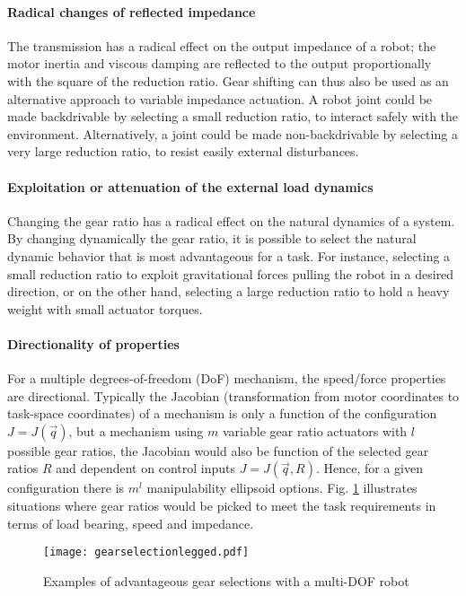 \paragraph{Radical changes of reflected impedance}
The transmission has a radical effect on the output impedance of a robot; the motor inertia and viscous damping are reflected to the output proportionally with the square of the reduction ratio. Gear shifting can thus also be used as an alternative approach to variable impedance actuation. A robot joint could be made backdrivable by selecting a small reduction ratio, to interact safely with the environment.  Alternatively, a joint could be made non-backdrivable by selecting a very large reduction ratio, to resist easily external disturbances.

\paragraph{Exploitation or attenuation of the external load dynamics}
Changing the gear ratio has a radical effect on the natural dynamics of a system. By changing dynamically the gear ratio, it is possible to select the natural dynamic behavior that is most advantageous for a task. For instance, selecting a small reduction ratio to exploit gravitational forces pulling the robot in a desired direction, or on the other hand, selecting a large reduction ratio to hold a heavy weight with small actuator torques.

\paragraph{Directionality of properties}
For a multiple degrees-of-freedom (DoF) mechanism, the speed/force properties are directional. Typically the Jacobian (transformation from motor coordinates to task-space coordinates) of a mechanism is only a function of the configuration $J=J(\vec{q})$, but a mechanism using $m$ variable gear ratio actuators with $l$ possible gear ratios, the Jacobian would also be function of the selected gear ratios $R$ and dependent on control inputs $J=J(\vec{q},R)$. Hence, for a given configuration there is $m^l$ manipulability ellipsoid options. Fig. \ref{fig:gearselectionlegged} illustrates situations where gear ratios would be picked to meet the task requirements in terms of load bearing, speed and impedance. 


\begin{figure}[hb]
	\centering
		\texttt{[image: gearselectionlegged.pdf]}
	\caption{Examples of advantageous gear selections with a multi-DOF robot}
	\label{fig:gearselectionlegged}
\end{figure}


